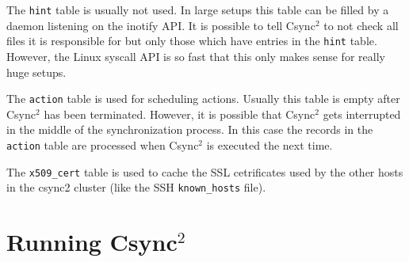 \documentclass[a4paper,twocolumn]{article}
\def\csync2{{\sc Csync$^{2}$}}
\begin{document}
The {\tt hint} table is usually not used. In large setups this table can be
filled by a daemon listening on the inotify API. It is possible to tell \csync2
to not check all files it is responsible for but only those which have entries
in the {\tt hint} table. However, the Linux syscall API is so fast that this
only makes sense for really huge setups.

The {\tt action} table is used for scheduling actions. Usually this table is
empty after \csync2 has been terminated. However, it is possible that \csync2
gets interrupted in the middle of the synchronization process. In this case
the records in the {\tt action} table are processed when \csync2 is executed
the next time.

The {\tt x509\_cert} table is used to cache the SSL cetrificates used by the
other hosts in the csync2 cluster (like the SSH {\tt known\_hosts} file).

\section{Running \csync2}

\end{document}
